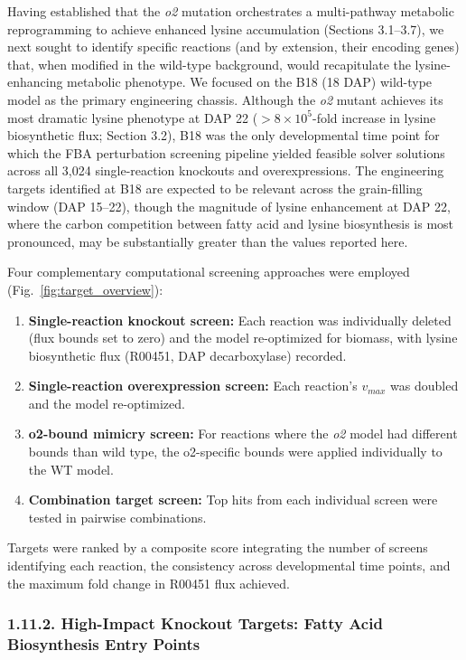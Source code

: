 \documentclass[12pt,a4paper]{article}
\begin{document}
Having established that the \textit{o2} mutation orchestrates a multi-pathway metabolic reprogramming to achieve enhanced lysine accumulation (Sections 3.1--3.7), we next sought to identify specific reactions (and by extension, their encoding genes) that, when modified in the wild-type background, would recapitulate the lysine-enhancing metabolic phenotype. We focused on the B18 (18 DAP) wild-type model as the primary engineering chassis. Although the \textit{o2} mutant achieves its most dramatic lysine phenotype at DAP 22 ($>8 \times 10^{5}$-fold increase in lysine biosynthetic flux; Section 3.2), B18 was the only developmental time point for which the FBA perturbation screening pipeline yielded feasible solver solutions across all 3,024 single-reaction knockouts and overexpressions. The engineering targets identified at B18 are expected to be relevant across the grain-filling window (DAP 15--22), though the magnitude of lysine enhancement at DAP 22, where the carbon competition between fatty acid and lysine biosynthesis is most pronounced, may be substantially greater than the values reported here.

Four complementary computational screening approaches were employed (Fig.~\ref{fig:target_overview}):
\begin{enumerate}
    \item \textbf{Single-reaction knockout screen:} Each reaction was individually deleted (flux bounds set to zero) and the model re-optimized for biomass, with lysine biosynthetic flux (R00451, DAP decarboxylase) recorded.
    \item \textbf{Single-reaction overexpression screen:} Each reaction's $v_{max}$ was doubled and the model re-optimized.
    \item \textbf{o2-bound mimicry screen:} For reactions where the \textit{o2} model had different bounds than wild type, the o2-specific bounds were applied individually to the WT model.
    \item \textbf{Combination target screen:} Top hits from each individual screen were tested in pairwise combinations.
\end{enumerate}

Targets were ranked by a composite score integrating the number of screens identifying each reaction, the consistency across developmental time points, and the maximum fold change in R00451 flux achieved.

\subsubsection{1.11.2. High-Impact Knockout Targets: Fatty Acid Biosynthesis Entry Points}
\end{document}
